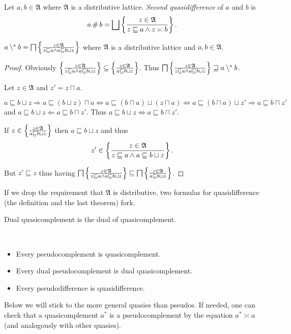 \begin{defn}
Let $a,b\in\mathfrak{A}$ where $\mathfrak{A}$
is a distributive lattice. \emph{Second quasidifference} of $a$ and
$b$ is
\[
a\mathop\#b=\bigsqcup\left\{ \frac{z\in\mathfrak{A}}{z\sqsubseteq a\land z\asymp b}\right\}.
\]
\end{defn}
\begin{thm}
$a\setminus^{\ast} b=\bigsqcap\left\{ \frac{z\in\mathfrak{A}}{z\sqsubseteq a\land a\sqsubseteq b\sqcup z}\right\}$
where $\mathfrak{A}$ is a distributive lattice and $a,b\in\mathfrak{A}$.\end{thm}
\begin{proof}
Obviously $\left\{ \frac{z\in\mathfrak{A}}{z\sqsubseteq a\land a\sqsubseteq b\sqcup z}\right\}\subseteq\left\{ \frac{z\in\mathfrak{A}}{a\sqsubseteq b\sqcup z}\right\}$.
Thus $\bigsqcap\left\{ \frac{z\in\mathfrak{A}}{z\sqsubseteq a\land a\sqsubseteq b\sqcup z}\right\}\sqsupseteq a\setminus^{\ast} b$.

Let $z\in\mathfrak{A}$ and $z'=z\sqcap a$.

$a\sqsubseteq b\sqcup z\Rightarrow a\sqsubseteq(b\sqcup z)\sqcap a\Leftrightarrow a\sqsubseteq(b\sqcap a)\sqcup(z\sqcap a)\Leftrightarrow a\sqsubseteq(b\sqcap a)\sqcup z'\Rightarrow a\sqsubseteq b\sqcap z'$
and $a\sqsubseteq b\sqcup z\Leftarrow a\sqsubseteq b\sqcap z'$. Thus
$a\sqsubseteq b\sqcup z\Leftrightarrow a\sqsubseteq b\sqcap z'$.

If $z\in\left\{ \frac{z\in\mathfrak{A}}{a\sqsubseteq b\sqcup z}\right\}$ then
$a\sqsubseteq b\sqcup z$ and thus
\[
z'\in\left\{ \frac{z\in\mathfrak{A}}{z\sqsubseteq a\land a\sqsubseteq b\sqcup z}\right\}.
\]


But $z'\sqsubseteq z$ thus having $\bigsqcap\left\{ \frac{z\in\mathfrak{A}}{z\sqsubseteq a\land a\sqsubseteq b\sqcup z}\right\}\sqsubseteq\bigsqcap\left\{ \frac{z\in\mathfrak{A}}{a\sqsubseteq b\sqcup z}\right\}$.\end{proof}
\begin{rem}
If we drop the requirement that $\mathfrak{A}$ is distributive, two
formulas for quasidifference (the definition and the last theorem)
fork.\end{rem}
\begin{obvious}
Dual quasicomplement is the dual of quasicomplement.
\end{obvious}

\begin{obvious}
~
\begin{itemize}
\item Every pseudocomplement is quasicomplement.
\item Every dual pseudocomplement is dual quasicomplement.
\item Every pseudodifference is quasidifference.
\end{itemize}
\end{obvious}
Below we will stick to the more general quasies than pseudos. If needed,
one can check that a quasicomplement $a^{\ast}$ is a pseudocomplement
by the equation $a^{\ast}\asymp a$ (and analogously with other quasies).

